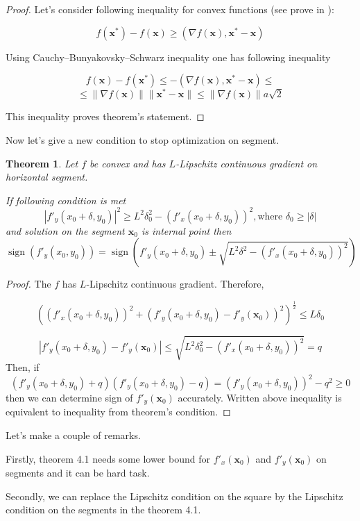 \documentclass[12pt]{article}
\newtheorem{theorem}{Theorem}[section]
\DeclareMathOperator{\sign}{sign}
\begin{document}
\begin{proof}
Let's consider following inequality for convex functions (see prove in \cite{Nesterov}):

$$f(\textbf{x}^*) - f(\textbf{x}) \geq (\nabla f(\textbf{x}), \textbf{x}^* - \textbf{x} )$$

Using  Cauchy–Bunyakovsky–Schwarz inequality one has following inequality

$$f(\textbf{x}) - f(\textbf{x}^*) \leq -(\nabla f(\textbf{x}), \textbf{x}^* - \textbf{x} )\leq$$
$$\leq \|\nabla f(\textbf{x})\| \|\textbf{x}^* - \textbf{x}\|\leq \|\nabla f(\textbf{x})\|a\sqrt{2}$$

This inequality proves theorem's statement.
\end{proof}

Now let's give a new condition to stop optimization on segment.

\begin{theorem}
Let $f$ be convex and has $L$-Lipschitz continuous gradient on horizontal segment.

If following condition is met 
$$|f'_y(x_0+\delta, y_0)|^2 \geq L^2\delta_0^2 - (f'_x(x_0 + \delta, y_0))^2, \text{where } \delta_0\geq|\delta| $$
and solution on the segment $\textbf{x}_0$ is internal point
then 
$$\sign\left(f'_y(x_0, y_0)\right) = \sign\left(f'_y(x_0+\delta, y_0) \pm \sqrt{L^2\delta^2 - (f'_x(x_0 + \delta, y_0))^2}\right)$$
\end{theorem}
\begin{proof}
The $f$ has $L$-Lipschitz continuous gradient. Therefore,

$$\left((f'_x(x_0 + \delta, y_0))^2 + \left(f'_y(x_0+\delta, y_0) - f'_y(\textbf{x}_0)\right)^2\right)^\frac{1}{2}\leq L\delta_0$$

$$|f'_y(x_0+\delta, y_0) - f'_y(\textbf{x}_0)|\leq \sqrt{L^2\delta_0^2 - (f'_x(x_0 + \delta, y_0))^2} = q$$
Then, if
$$(f'_y(x_0+\delta, y_0)+q)(f'_y(x_0+\delta, y_0)-q) = (f'_y(x_0+\delta, y_0))^2-q^2 \geq 0$$
then we can determine sign of $f'_y(\textbf{x}_0)$ accurately. Written above inequality is equivalent to inequality from theorem's condition.
\end{proof}

Let's make a couple of remarks.

Firstly, theorem 4.1 needs some lower bound for $f'_{x}(\textbf{x}_0)$ and $f'_{y}(\textbf{x}_0)$ on segments and it can be hard task.

Secondly, we can replace the Lipschitz condition on the square by the Lipschitz condition on the segments in the theorem 4.1.
\end{document}
